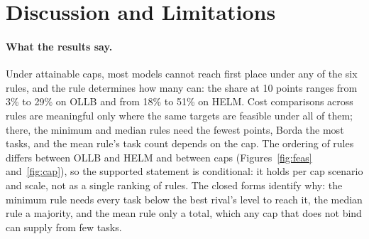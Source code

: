\section{Discussion and Limitations}
\label{sec:limits}

\paragraph{What the results say.}
Under attainable caps, most models cannot reach first place under any of the six rules, and the rule determines how many can: the share at 10 points ranges from 3\% to 29\% on OLLB and from 18\% to 51\% on HELM.
Cost comparisons across rules are meaningful only where the same targets are feasible under all of them; there, the minimum and median rules need the fewest points, Borda the most tasks, and the mean rule's task count depends on the cap.
The ordering of rules differs between OLLB and HELM and between caps (Figures~\ref{fig:feas} and~\ref{fig:cap}), so the supported statement is conditional: it holds per cap scenario and scale, not as a single ranking of rules.
The closed forms identify why: the minimum rule needs every task below the best rival's level to reach it, the median rule a majority, and the mean rule only a total, which any cap that does not bind can supply from few tasks.


